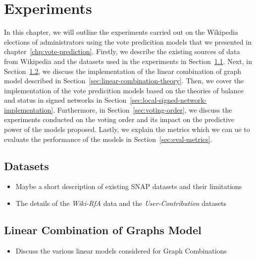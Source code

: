 \chapter{Experiments}
\label{chp:experiments}
In this chapter, we will outline the experiments carried out on the Wikipedia elections of administrators using the vote predicition models that we presented in chapter~\ref{chp:vote-prediction}.
Firstly, we describe the existing sources of data from Wikipedia and the datasets used in the experiments in Section~\ref{sec:datasets}.
Next, in Section~\ref{sec:linear-combination-implementation}, we discuss the implementation of the linear combination of graph model described in Section~\ref{sec:linear-combination-theory}.
Then, we cover the implementation of the vote predicition models based on the theories of balance and status in signed networks in Section~\ref{sec:local-signed-network-implementation}.
Furthermore, in Section~\ref{sec:voting-order}, we discuss the experiments conducted on the voting order and its impact on the predictive power of the models proposed.
Lastly, we explain the metrics which we can ue to evaluate the performance of the models in Section~\ref{sec:eval-metrics}.


\section{Datasets}
\label{sec:datasets}
\begin{itemize}
    \item Maybe a short description of existing SNAP datasets and their limitations
    \item The details of the \textit{Wiki-RfA} data and the \textit{User-Contribution} datasets
\end{itemize}

\section{Linear Combination of Graphs Model}
\label{sec:linear-combination-implementation}
\begin{itemize}
    \item Discuss the various linear models considered for Graph Combinations
\end{itemize}    
